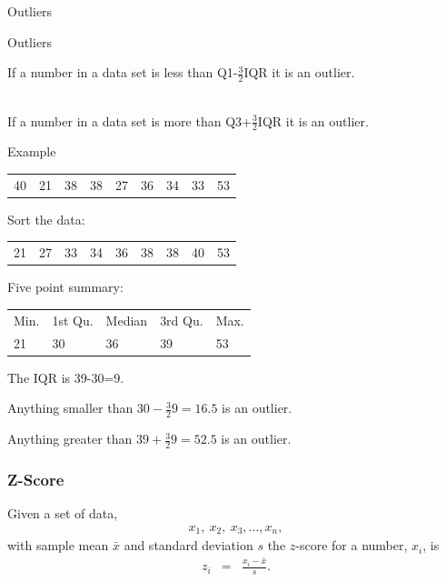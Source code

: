 \begin{frame}{Outliers}

  \begin{definition}{Outliers}

    If a number in a data set is less than Q1-$\frac{3}{2}$IQR it is
    an outlier.

    ~ \\

    If a number in a data set is more than Q3+$\frac{3}{2}$IQR it is
    an outlier.

  \end{definition}
  
\end{frame}

\begin{frame}{Example}

  \begin{tabular}{lllllllll}
    40 & 21 & 38 & 38 & 27 & 36 & 34 & 33 & 53 
  \end{tabular}

  {
    Sort the data: \\
    \begin{tabular}{lllllllll}
      21 & 27 & 33 & 34 & 36 & 38 & 38 & 40 & 53
    \end{tabular}

    Five point summary: \\
    \begin{tabular}{lllll}
      Min. & 1st Qu. & Median    & 3rd Qu. &   Max. \\
      21   & 30      & 36        & 39     & 53
    \end{tabular}
    
    The IQR is 39-30=9.

    Anything smaller than $30-\frac{3}{2}9=16.5$ is an outlier.

    Anything greater than $39+\frac{3}{2}9=52.5$ is an outlier.

  }
  
\end{frame}


\begin{frame}
  \frametitle{Z-Score}

  \begin{definition}
    Given a set of data,
    \begin{eqnarray*}
      x_1,~x_2,~x_3,\ldots,x_n,
    \end{eqnarray*}
    with sample mean $\bar{x}$ and standard deviation $s$ the
    $z$-score for a number, $x_i$, is
    \begin{eqnarray*}
      z_i & = & \frac{x_i-\bar{x}}{s}.
    \end{eqnarray*}
  \end{definition}

\end{frame}


